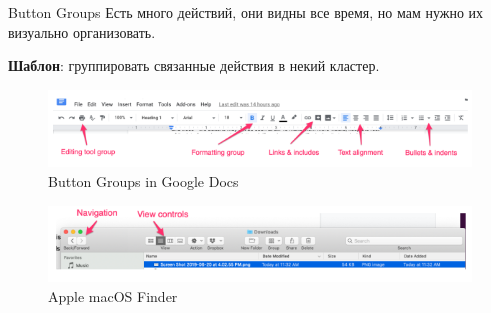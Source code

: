 \documentclass{beamer}
\begin{document}
\begin{frame}[t]{Button Groups}
	Есть много действий, они видны все время, но мам нужно их визуально организовать.

	\textbf{Шаблон}: группировать связанные действия в некий кластер.

	\begin{figure}[h]
		\centering
		\includegraphics[scale=0.6]{images/lec08-pic02.png}
		\caption{Button Groups in Google Docs}
	\end{figure}
	\begin{figure}[h]
		\centering
		\includegraphics[scale=0.6]{images/lec08-pic03.png}
		\caption{Apple macOS Finder}
	\end{figure}	
\end{frame}	
\end{document}
